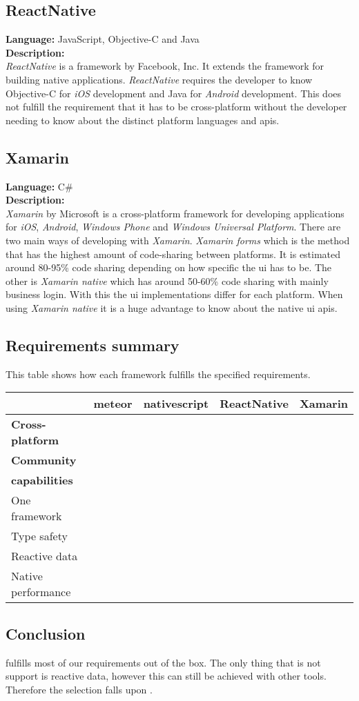 \subsection*{ReactNative}
\textbf{Language:} JavaScript, Objective-C and Java
\\
\textbf{Description:}
\\
\textit{ReactNative} is a framework by Facebook, Inc.
It extends the  framework for building native applications.
\textit{ReactNative} requires the developer to know Objective-C for \textit{iOS} development and Java for \textit{Android} development.
This does not fulfill the requirement that it has to be cross-platform without the developer needing to know about the distinct platform languages and \glspl{api}.


\subsection*{Xamarin}
\textbf{Language:} C\#
\\
\textbf{Description:}
\\
\textit{Xamarin} by Microsoft is a cross-platform framework for developing applications for \textit{iOS}, \textit{Android}, \textit{Windows Phone} and \textit{Windows Universal Platform}.
There are two main ways of developing with \textit{Xamarin}.
\textit{Xamarin forms} which is the method that has the highest amount of code-sharing between platforms.
It is estimated around 80-95\% code sharing depending on how specific the \gls{ui} has to be.
The other is \textit{Xamarin native} which has around 50-60\% code sharing with mainly business login.
With this the \gls{ui} implementations differ for each platform.
When using \textit{Xamarin native} it is a huge advantage to know about the native \gls{ui} \glspl{api}.

\subsection*{Requirements summary}
This table shows how each framework fulfills the specified requirements.

\begin{tabularx}{\textwidth}{|l|C C C C|}
	\hline
	& \gls{meteor} & \gls{nativescript} & ReactNative & Xamarin \\
	\hline
	\textbf{Cross-platform} & \cmark & \cmark & \cmark & \cmark \\
	\hline
	\textbf{Community} & \cmark & \cmark & \cmark & \cmark \\
	\hline
	\textbf{ capabilities} & \cmark & \cmark & \cmark & \cmark \\
	\hline
	One framework & \cmark & \cmark & \xmark & \xmark \\
	\hline
	Type safety & \xmark & \cmark & \xmark & \cmark \\
	\hline
	Reactive data & \cmark & \xmark & \xmark & \xmark \\
	\hline
	Native performance & \xmark & \cmark & \cmark & \cmark \\
	\hline
\end{tabularx}

\subsection*{Conclusion}
 fulfills most of our requirements out of the box.
The only thing that is not support is reactive data, however this can still be achieved with other tools.
Therefore the selection falls upon .

